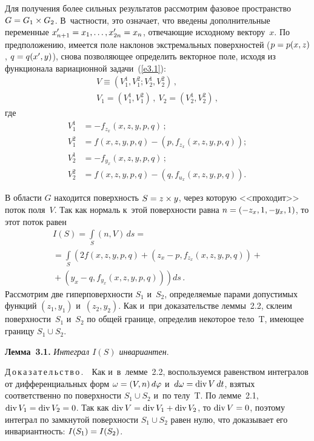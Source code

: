 \begin{multicols}{2}
    Для получения более сильных результатов рассмотрим фазовое пространство 
$G\hm= G_1\times G_2$. В~частности, это означает, что введены дополнительные 
переменные $x_{n+1}^\prime \hm= x_1,\ldots , x_{2n}^\prime\hm= x_n$, отвечающие 
исходному вектору~$x$. По предположению, имеется поле наклонов экстремальных 
поверхностей ($p\hm= p(x,z)$, $q\hm= q(x^\prime, y)$), снова позволяющее 
определить векторное поле, исходя из функционала вариационной 
задачи~(\ref{e3.1}): 
    \begin{multline*}
    V\equiv \left( V_1^1, V_1^2; V_2^1, V_2^2\right)\,,\\
     V_1=\left( V_1^1, 
V_1^2\right)\,,\ V_2= \left( V_2^1, V_2^2\right)\,,
\end{multline*}
где
\begin{align*}
    V_1^1 &=-f_{z_x}(x,z,y,p,q)\,;\\
    V_1^2&= f(x,z,y,p,q)-\left(p,f_{z_x}(x,z,y,p,q)\right);\\
    V_2^1 &=-f_{y_x} (x,z,y,p,q)\,;\\
     V_2^2 &= f(x,z,y,p,q) -\left( q, f_{u_x}(x,z,y,p,q)\right).
    \end{align*}
    
    В области $G$ находится поверхность $S\hm= z\times y$, через которую 
<<проходит>> поток поля~$V$. Так как нормаль к~этой поверхности равна $n\hm= 
(-z_x,1,-y_x,1)$, то этот поток равен
   \begin{multline*}
    I(S)= \int\limits_S (n,V)\,ds ={}\\
    {}=\int\limits_S \left(2f(x,z,y,p,q) +\left (z_x -p, f_{z_x} 
(x,z,y,p,q)\right) +{}\right.\\
\left.{}+\left( y_x-q, f_{y_x}(x,z,y,p,q)\right)\right)ds\,.
    \end{multline*}
       Рассмотрим две гиперповерхности $S_1$ и~$S_2$, определяемые парами 
допустимых функций $(z_1,y_1)$ и~$(z_2,y_2)$. Как и~при доказательстве леммы~2.2, 
склеим поверхности~$S_1$ и~$S_2$ по общей границе, определив некоторое тело~T, 
имеющее границу $S_1\cup S_2$. 
    
    \smallskip
    
    \noindent
    \textbf{Лемма~3.1.} \textit{Интеграл  $I(S)$ инвариантен}. 
    
    \smallskip
    
    \noindent
    Д\,о\,к\,а\,з\,а\,т\,е\,л\,ь\,с\,т\,в\,о\,.\ \ Как и~в~лемме~2.2, воспользуемся 
равенством интегралов от дифференциальных форм $\omega\hm= (V,n)\,d\varphi$ 
и~$d\omega \hm= \mathrm{div}\,V\,dt$, взятых соответственно по поверхности $S_1\cup S_2$ 
и~по телу~T. По лемме~2.1, $\mathrm{div}\, V_1\hm= \mathrm{div}\, V_2\hm=0$. Так как $\mathrm{div}\, V\hm= \mathrm{div}\, 
V_1\hm+ \mathrm{div}\, V_2$, то $\mathrm{div}\, V\hm=0$, поэтому интеграл по замкнутой поверхности 
$S_1\cup S_2$ равен нулю, что доказывает его инвариантность: $I(S_1)\hm= I(S_2)$.
     

\end{multicols}
